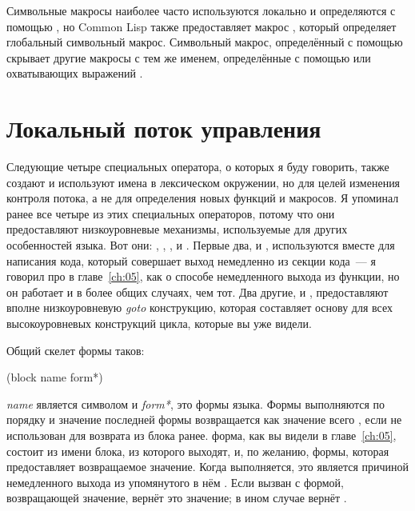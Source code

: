 Символьные макросы наиболее часто используются локально и определяются с помощью
, но Common Lisp также предоставляет макрос
, который определяет глобальный символьный макрос.  Символьный
макрос, определённый с помощью  скрывает другие макросы с тем же
именем, определённые с помощью  или охватывающих выражений
.

\section{Локальный поток управления}

Следующие четыре специальных оператора, о которых я буду говорить, также создают и
используют имена в лексическом окружении, но для целей изменения контроля потока, а не для
определения новых функций и макросов. Я упоминал ранее все четыре из этих специальных
операторов, потому что они предоставляют низкоуровневые механизмы, используемые для других
особенностей языка. Вот они: , , , и
. Первые два,  и , используются вместе для
написания кода, который совершает выход немедленно из секции кода~--- я говорил про
 в главе~\ref{ch:05}, как о способе немедленного выхода из функции, но
он работает и в более общих случаях, чем тот. Два другие,  и ,
предоставляют вполне низкоуровневую \textit{goto} конструкцию, которая составляет основу для всех
высокоуровневых конструкций цикла, которые вы уже видели.

Общий скелет формы  таков:

\begin{myverb}
(block name
  form*)
\end{myverb}

\textit{name} является символом и \textit{form*}, это формы языка. Формы выполняются по
порядку и значение последней формы возвращается как значение всего , если не
использован  для возврата из блока ранее.  форма, как
вы видели в главе~\ref{ch:05}, состоит из имени блока, из которого выходят, и, по желанию, формы,
которая предоставляет возвращаемое значение.  Когда  выполняется, это
является причиной немедленного выхода из упомянутого в нём .  Если
 вызван с формой, возвращающей значение,  вернёт это
значение; в ином случае  вернёт .

